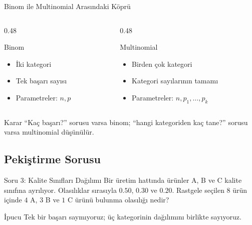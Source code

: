 \documentclass[light]{lutbeamer}
\begin{document}
\begin{frame}{Binom ile Multinomial Arasındaki Köprü}
    \small
    \begin{columns}[T]
        \begin{column}{0.48\textwidth}
            \begin{block}{Binom}
                \begin{itemize}
                    \item İki kategori
                    \item Tek başarı sayısı
                    \item Parametreler: \(n,p\)
                \end{itemize}
            \end{block}
        \end{column}
        \begin{column}{0.48\textwidth}
            \begin{block}{Multinomial}
                \begin{itemize}
                    \item Birden çok kategori
                    \item Kategori sayılarının tamamı
                    \item Parametreler: \(n,p_1,\dots,p_k\)
                \end{itemize}
            \end{block}
        \end{column}
    \end{columns}

    \begin{alertblock}{Karar}
        ``Kaç başarı?'' sorusu varsa binom; ``hangi kategoriden kaç tane?'' sorusu varsa multinomial düşünülür.
    \end{alertblock}
\end{frame}

\subsection{Pekiştirme Sorusu}

\begin{frame}{Soru 3: Kalite Sınıfları Dağılımı}
    \small
    Bir üretim hattında ürünler A, B ve C kalite sınıfına ayrılıyor. Olasılıklar sırasıyla \(0.50\), \(0.30\) ve \(0.20\). Rastgele seçilen \(8\) ürün içinde \(4\) A, \(3\) B ve \(1\) C ürünü bulunma olasılığı nedir?

    \begin{block}{İpucu}
        Tek bir başarı saymıyoruz; üç kategorinin dağılımını birlikte sayıyoruz.
    \end{block}
\end{frame}
\end{document}
